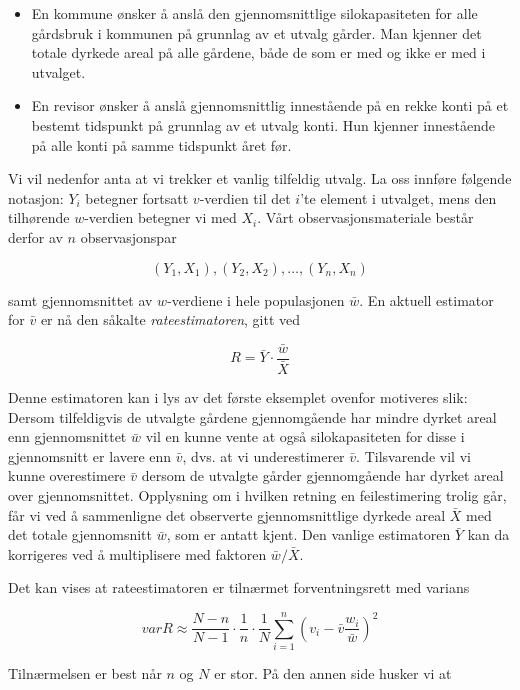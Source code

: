\begin{itemize}
\item  En kommune ønsker å anslå den gjennomsnittlige 
       silokapasiteten for alle gårdsbruk i kommunen på grunnlag av 
       et utvalg gårder.  Man kjenner det totale dyrkede areal på
       alle gårdene, både de som er med og ikke er med i utvalget.

\item  En revisor ønsker å anslå gjennomsnittlig innestående
       på en rekke konti på et bestemt tidspunkt på grunnlag av
       et utvalg konti.  Hun kjenner innestående på alle konti på
       samme tidspunkt året før.
\end{itemize}

Vi vil nedenfor anta at vi trekker et vanlig tilfeldig utvalg.  La oss 
innføre følgende notasjon:  $Y_i$ betegner fortsatt $v$-verdien til 
det $i$'te element i utvalget, mens den tilhørende $w$-verdien betegner
vi med $X_i$.  Vårt observasjonsmateriale består derfor av $n$
observasjonspar

\[ (Y_1, X_1), (Y_2, X_2), \ldots ,(Y_n, X_n) \]

\noindent samt gjennomsnittet av $w$-verdiene i hele populasjonen $\bar{w}$.
 En aktuell estimator for $\bar{v}$ er nå den såkalte
 {\em rateestimatoren}, gitt ved 

\[  R=\bar{Y} \cdot \frac{\bar{w}}{\bar{X}}       \]

\noindent Denne estimatoren kan i lys av det første eksemplet ovenfor
 motiveres slik:  Dersom tilfeldigvis de utvalgte gårdene
gjennomgående har
mindre dyrket areal enn gjennomsnittet $\bar{w}$ vil en kunne vente at 
også silokapasiteten for disse i gjennomsnitt er lavere enn $\bar{v}$,
dvs. at vi underestimerer $\bar{v}$.  Tilsvarende vil vi kunne overestimere
$\bar{v}$ dersom de utvalgte gårder gjennomgående har dyrket areal
over gjennomsnittet.  Opplysning om i hvilken retning en feilestimering
trolig går, får vi ved å sammenligne det observerte 
gjennomsnittlige dyrkede areal $\bar{X}$ med det totale gjennomsnitt $\bar
{w}$, som er antatt kjent.  Den vanlige estimatoren  $\bar{Y}$ kan
da korrigeres ved å multiplisere med faktoren $\bar{w}/\bar{X}$.

Det kan vises at rateestimatoren er tilnærmet forventningsrett med
varians

\[ varR \approx \frac{N-n}{N-1} \cdot \frac{1}{n} \cdot \frac{1}{N}
                       \sum_{i=1}^n{(v_i-\bar{v} \frac{w_i}{\bar{w}})}^2 \]

\noindent Tilnærmelsen er best når $n$ og $N$ er stor.  På den
 annen side husker vi at


